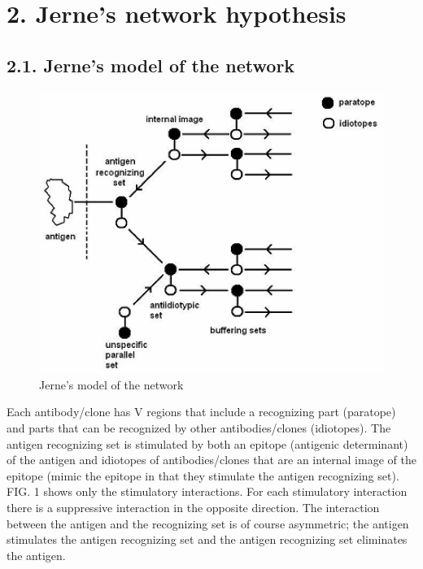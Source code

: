 \documentclass[Proceedings]{ascelike}
\begin{document}
\section{2. Jerne's network hypothesis}

\subsection{2.1. Jerne's model of the network}
\begin{figure}
\centering
    \includegraphics[scale=0.5] {img/network_model_jerne.png}
    \caption{Jerne’s model of the network}
\end{figure}
Each antibody/clone has V regions that include a recognizing part (paratope) and parts that can be recognized by other antibodies/clones (idiotopes). The antigen recognizing set is stimulated by both an epitope (antigenic determinant) of the antigen and idiotopes of antibodies/clones that are an internal image of the epitope (mimic the epitope in that they stimulate the antigen recognizing set). FIG. 1 shows only the stimulatory interactions. For each stimulatory interaction there is a suppressive interaction in the opposite direction. The interaction between the antigen and the recognizing set is of course asymmetric; the antigen stimulates the antigen recognizing set and the antigen recognizing set eliminates the antigen.
\par
\end{document}
